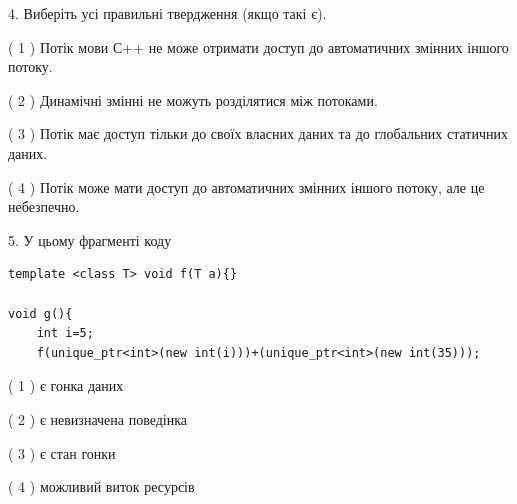 \documentclass[12pt, ukrainian]{article}
\begin{document}
\begin {large}
{%
4. Виберіть усі правильні твердження (якщо такі є).\par


( 1 ) Потік мови С++ не може отримати доступ до автоматичних змінних іншого потоку.%

( 2 ) Динамічні змінні не можуть розділятися між потоками.%

( 3 ) Потік має доступ тільки до своїх власних даних та до глобальних статичних даних.%

( 4 ) Потік може мати доступ до автоматичних змінних іншого потоку, але це небезпечно.%


5. У цьому фрагменті коду
\begin{verbatim}
template <class T> void f(T a){}

void g(){
    int i=5;
    f(unique_ptr<int>(new int(i)))+(unique_ptr<int>(new int(35)));
\end{verbatim}
( 1 ) є гонка даних%

( 2 ) є невизначена поведінка%

( 3 ) є стан гонки%

( 4 ) можливий виток ресурсів%
}
\end {large}
\end{document}

